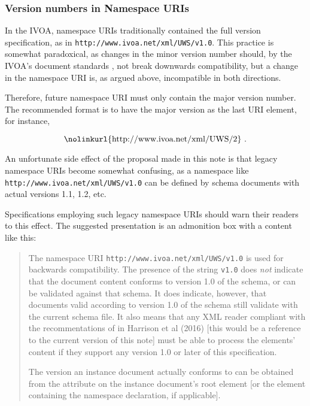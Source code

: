 \documentclass[10pt,a4paper]{ivoa}
\begin{document}
\subsubsection{Version numbers in Namespace URIs}

In the IVOA, namespace URIs traditionally contained the full version
specification, as in \nolinkurl{http://www.ivoa.net/xml/UWS/v1.0}.
This practice is somewhat paradoxical, as changes in the minor version
number should, by the IVOA's document standards
\citep{2010ivoa.spec.0413H}, not break downwards compatibility, but a
change in the namespace URI is, as argued above, incompatible in both
directions.

Therefore, future namespace URI must only contain the major version
number.  The recommended format is to have the major version as the last
URI element, for instance,

$$\hbox{\nolinkurl{http://www.ivoa.net/xml/UWS/2} .}$$

An unfortunate side effect of the proposal made in this note is
that legacy namespace URIs become somewhat confusing, as a namespace
like \nolinkurl{http://www.ivoa.net/xml/UWS/v1.0} can be defined by
schema documents with actual versions 1.1, 1.2, etc.  

Specifications employing such legacy namespace URIs should warn their
readers to this effect.  The suggested presentation is an admonition box
with a content like this:

\begin{quotation}
The namespace URI \nolinkurl{http://www.ivoa.net/xml/UWS/v1.0} is used
for backwards compatibility.  The presence of the string \texttt{v1.0}
does \emph{not} indicate that the document content conforms to version
1.0 of the schema, or can be validated against that schema.  It does
indicate, however, that documents valid according to version 1.0 of the
schema still validate with the current schema file.  It also means that
any XML reader compliant with the recommentations of in Harrison et al
(2016) [this would be a reference to the current version of this note]
must be able to process the elements' content if they support any
version 1.0 or later of this specification.

The version an instance document actually conforms to can be obtained
from the  attribute on the instance document's root
element [or the element containing the namespace declaration, if
applicable].  
\end{quotation}
\end{document}
